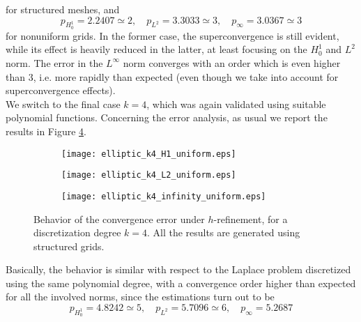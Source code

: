 \documentclass[10pt]{article}
\begin{document}
for structured meshes, and
$$p_{H^1_0}=2.2407\simeq2, \quad p_{L^2}=3.3033\simeq3, \quad p_\infty=3.0367\simeq3$$
for nonuniform grids. In the former case, the superconvergence is still evident, while its effect is heavily reduced in the latter, at least focusing on the $H_0^1$ and $L^2$ norm. The error in the $L^\infty$ norm converges with an order which is even higher than $3$, i.e. more rapidly than expected (even though we take into account for superconvergence effects). \\
We switch to the final case $k=4$, which was again validated using suitable polynomial functions. Concerning the error analysis, as usual we report the results in Figure \ref{fig:ell_k4_uniform}.
\begin{figure}[H]
	\centering
	\begin{subfigure}{0.32\textwidth}
		\centering
		\texttt{[image: elliptic\_k4\_H1\_uniform.eps]}
		\label{fig:ell_k4_H1_uniform}
	\end{subfigure}
	\begin{subfigure}{0.32\textwidth}
		\centering
		\texttt{[image: elliptic\_k4\_L2\_uniform.eps]}
		\label{fig:ell_k4_L2_uniform}
	\end{subfigure}
	\begin{subfigure}{0.32\textwidth}
		\centering
		\texttt{[image: elliptic\_k4\_infinity\_uniform.eps]}
		\label{fig:ell_k4_infinity_uniform}
	\end{subfigure}
	\caption{Behavior of the convergence error under $h$-refinement, for a discretization degree $k=4$. All the results are generated using structured grids.}
	\label{fig:ell_k4_uniform}
\end{figure}
Basically, the behavior is similar with respect to the Laplace problem discretized using the same polynomial degree, with a convergence order higher than expected for all the involved norms, since the estimations turn out to be
$$p_{H^1_0}=4.8242\simeq5, \quad p_{L^2}=5.7096\simeq6, \quad p_\infty=5.2687$$
\end{document}
